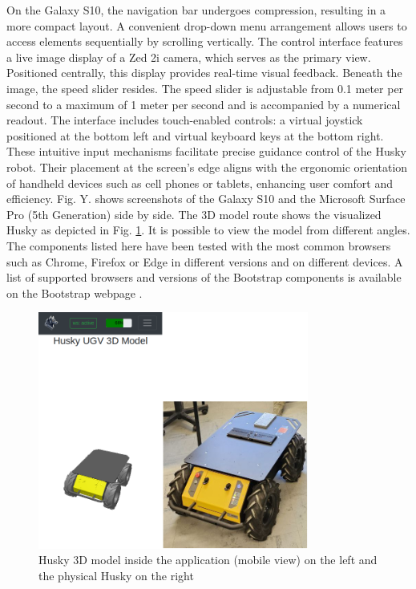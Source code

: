 \documentclass[conference]{IEEEtran}
\begin{document}
On the Galaxy S10, the navigation bar undergoes compression, resulting in a more compact layout.
A convenient drop-down menu arrangement allows users to access elements sequentially by scrolling vertically.
The control interface features a live image display of a Zed 2i camera, which serves as the primary view. Positioned centrally, this display provides real-time visual feedback. Beneath the image, the speed slider resides. The speed slider is adjustable from 0.1 meter per second to a maximum of 1 meter per second and is accompanied by a numerical readout.
The interface includes touch-enabled controls: a virtual joystick positioned at the bottom left and virtual keyboard keys at the bottom right. These intuitive input mechanisms facilitate precise guidance control of the Husky robot. Their placement at the screen's edge aligns with the ergonomic orientation of handheld devices such as cell phones or tablets, enhancing user comfort and efficiency. 
Fig. Y. shows screenshots of the Galaxy S10 and the Microsoft Surface Pro (5th Generation) side by side.
The 3D model route shows the visualized Husky as depicted in Fig. \ref{fig:3dreal}. It is possible to view the model from different angles.
The components listed here have been tested with the most common browsers such as Chrome, Firefox or Edge in different versions and on different devices. A list of supported browsers and versions of the Bootstrap components is available on the Bootstrap webpage \cite{bsBrowsers}. 
\begin{figure}[hbp]
    \centerline{\includegraphics[width=8.9cm]{Pictures/3dreal.png}}
    \caption{Husky 3D model inside the application (mobile view) on the left and the physical Husky on the right}
    \label{fig:3dreal}
\end{figure}
\end{document}
